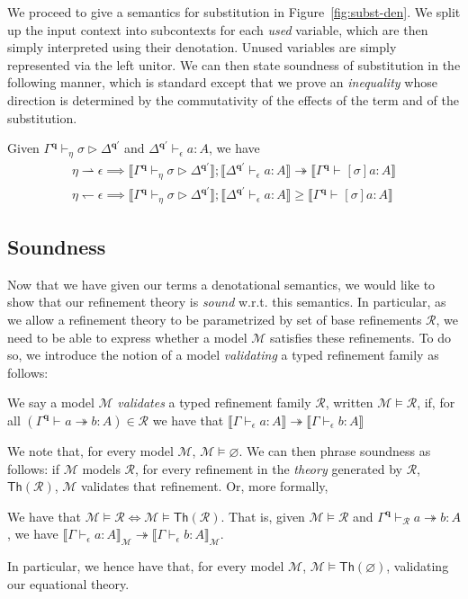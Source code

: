 \documentclass[acmsmall,screen,review]{acmart}
\newcommand{\mc}[1]{\ensuremath{\mathcal{#1}}}
\newcommand{\mb}[1]{\ensuremath{\mathbf{#1}}}
\newcommand{\ms}[1]{\ensuremath{\mathsf{#1}}}
\newcommand{\hasty}[4]{#1 \vdash_{#2} #3: {#4}}
\newcommand{\issubst}[4]{#1 \vdash_{#2} #3 \rhd #4}
\newcommand{\tref}{\twoheadrightarrow}
\newcommand{\cref}{\twoheadrightarrow}
\newcommand{\tmle}[5]{#1 \vdash_{#2} #3 \tref #4 : {#5}}
\newcommand{\dnt}[1]{\llbracket{#1}\rrbracket}
\newcommand{\rightmove}{\rightharpoonup}
\newcommand{\leftmove}{\leftharpoondown}
\begin{document}
We proceed to give a semantics for substitution in Figure~\ref{fig:subst-den}. We split up the input
context into subcontexts for each \emph{used} variable, which are then simply interpreted using
their denotation. Unused variables are simply represented via the left unitor. We can then state
soundness of substitution in the following manner, which is standard except that we prove an
\emph{inequality} whose direction is determined by the commutativity of the effects of the term and
of the substitution. 

\begin{theorem}
  Given $\issubst{\Gamma^{\mb{q}}}{\eta}{\sigma}{\Delta^{\mb{q'}}}$ and
  $\hasty{\Delta^{\mb{q}'}}{\epsilon}{a}{A}$, we have
  \begin{align*}
  \eta \rightmove \epsilon \implies
  \dnt{\issubst{\Gamma^{\mb{q}}}{\eta}{\sigma}{\Delta^{\mb{q'}}}} 
    ; \dnt{\hasty{\Delta^{\mb{q}'}}{\epsilon}{a}{A}}
  \cref \dnt{\hasty{\Gamma^{\mb{q}}}{}{[\sigma]a}{A}} \\
  \eta \leftmove \epsilon \implies
  \dnt{\issubst{\Gamma^{\mb{q}}}{\eta}{\sigma}{\Delta^{\mb{q'}}}} 
    ; \dnt{\hasty{\Delta^{\mb{q}'}}{\epsilon}{a}{A}}
  \geq \dnt{\hasty{\Gamma^{\mb{q}}}{}{[\sigma]a}{A}}
  \end{align*}
\end{theorem}

\subsection{Soundness}

Now that we have given our terms a denotational semantics, we would like to show that our refinement
theory is \emph{sound} w.r.t. this semantics. In particular, as we allow a refinement theory to be
parametrized by set of base refinements $\mc{R}$, we need to be able to express whether a model
$\mc{M}$ satisfies these refinements. To do so, we introduce the notion of a model \emph{validating}
a typed refinement family as follows:
\begin{definition}
  We say a model $\mc{M}$ \emph{validates} a typed refinement family $\mc{R}$, written $\mc{M}
  \models \mc{R}$, if, for all
  $
  (\tmle{\Gamma^{\mb{q}}}{}{a}{b}{A}) \in \mc{R}
  $
  we have that
  $
  \dnt{\hasty{\Gamma}{\epsilon}{a}{A}} \tref \dnt{\hasty{\Gamma}{\epsilon}{b}{A}}
  $
\end{definition}
We note that, for every model $\mc{M}$, $\mc{M} \models \varnothing$. We can then phrase soundness
as follows: if $\mc{M}$ models $\mc{R}$, for every refinement in the \emph{theory} generated by
$\mc{R}$, $\ms{Th}(\mc{R})$, $\mc{M}$ validates that refinement. Or, more formally,
\begin{theorem}[Soundness]
  We have that $\mc{M} \models \mc{R} \iff \mc{M} \models \ms{Th}(\mc{R})$. That is, given $\mc{M}
  \models \mc{R}$ and $\tmle{\Gamma^{\mb{q}}}{\mc{R}}{a}{b}{A}$, we have
  $\dnt{\hasty{\Gamma}{\epsilon}{a}{A}}_{\mc{M}} \cref
  \dnt{\hasty{\Gamma}{\epsilon}{b}{A}}_{\mc{M}}$.
\end{theorem}
In particular, we hence have that, for every model $\mc{M}$, $\mc{M} \models \ms{Th}(\varnothing)$,
validating our equational theory.
\end{document}
